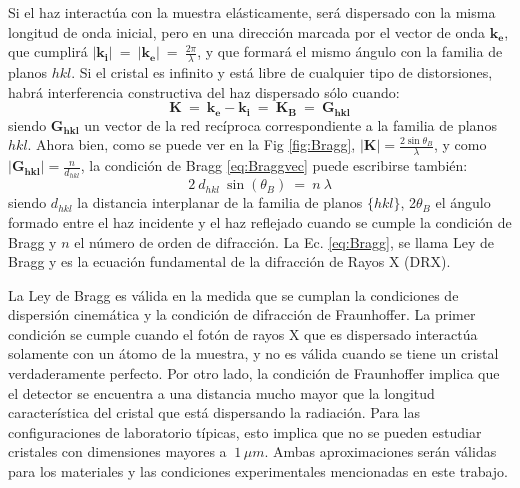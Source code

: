 Si el haz interactúa con la muestra elásticamente, será dispersado con la misma longitud de onda inicial, pero en una dirección marcada por el vector de onda $\mathbf{k_e}$, que cumplirá $\lvert \mathbf{k_i} \rvert \ = \ \lvert \mathbf{k_e} \rvert \ = \ \frac{2\pi}{\lambda}$, y que formará el mismo ángulo con la familia de planos ${hkl}$.
Si el cristal es infinito y está libre de cualquier tipo de distorsiones, habrá interferencia constructiva del haz dispersado sólo cuando:
\begin{equation}
  \mathbf{K} \ = \ \mathbf{k_e} - \mathbf{k_i} \ = \ \mathbf{K_B} \ = \ \mathbf{G_{hkl}}
  \label{eq:Braggvec}
\end{equation}
\noindent
siendo $\mathbf{G_{hkl}}$ un vector de la red recíproca correspondiente a la familia de planos ${hkl}$.
Ahora bien, como se puede ver en la Fig \ref{fig:Bragg}, $\displaystyle \lvert \mathbf{K} \rvert = \frac{2\sin\theta_B}{\lambda}$, y como $\displaystyle\lvert \mathbf{G_{hkl}} \rvert = \frac{n}{d_{hkl}}$, la condición de Bragg \ref{eq:Braggvec} puede escribirse también:
\begin{equation}
  2 \ d_{hkl} \ \sin(\theta_{B}) \ = \ n \ \lambda
  \label{eq:Bragg}
\end{equation}
\noindent
siendo $d_{hkl}$ la distancia interplanar de la familia de planos $\{hkl\}$, 2$\theta_{B}$ el ángulo formado entre el haz incidente y el haz reflejado cuando se cumple la condición de Bragg y $n$ el número de orden de difracción. La Ec. \ref{eq:Bragg}, se llama Ley de Bragg y es la ecuación fundamental de la difracción de Rayos X (DRX). 

La Ley de Bragg es válida en la medida que se cumplan la condiciones de dispersión cinemática y la condición de difracción de Fraunhoffer. 
La primer condición se cumple cuando el fotón de rayos X que es dispersado interactúa solamente con un átomo de la muestra, y no es válida cuando se tiene un cristal verdaderamente perfecto.
Por otro lado, la condición de Fraunhoffer implica que el detector se encuentra a una distancia mucho mayor que la longitud característica del cristal que está dispersando la radiación.
Para las configuraciones de laboratorio típicas, esto implica que no se pueden estudiar cristales con dimensiones mayores a $~1\,\mu m$.
Ambas aproximaciones serán válidas para los materiales y las condiciones experimentales mencionadas en este trabajo.



